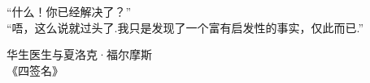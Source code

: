 \begin{flushright}
\begin{minipage}{.9\textwidth}
“什么！你已经解决了？”\\
“唔，这么说就过头了.我只是发现了一个富有启发性的事实，仅此而已.”
\begin{flushright}华生医生与夏洛克·福尔摩斯\\《四签名》\end{flushright}
\end{minipage}
\end{flushright}
